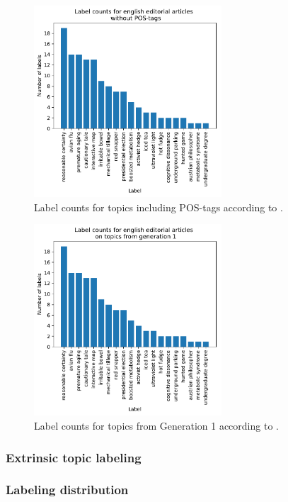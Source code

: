 {\begin{figure}
\begin{minipage}[b]{0.5\textwidth}
	\end{minipage}%
	\begin{minipage}[b]{0.5\textwidth}
		\includegraphics[width=7cm]{gfx/POS-gen1/ohne_POS.pdf}
	\end{minipage}%
	\caption{Label counts for topics including \ac{POS}-tags according to \cite{Mei2007}.}
\end{figure}

\begin{figure}
	\includegraphics[width=7cm]{gfx/POS-gen1/alte_topics.pdf}
	\caption{Label counts for topics from Generation 1 according to \cite{Mei2007}.}
\end{figure}


\subsubsection{Extrinsic topic labeling}
\subsubsection{Labeling distribution}

}
